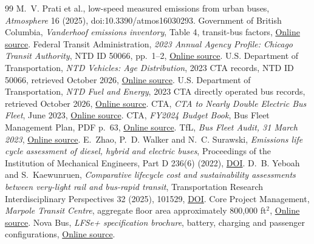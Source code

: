 \documentclass[12pt,letterpaper]{article}
\begin{document}
\begin{thebibliography}{99}
 M.~V. Prati et al., low-speed measured emissions from urban buses, \emph{Atmosphere} 16 (2025), doi:10.3390/atmos16030293.
 Government of British Columbia, \emph{Vanderhoof emissions inventory}, Table 4, transit-bus factors, \href{https://www2.gov.bc.ca/gov/content/environment/air-land-water/air/reports/emission-inventory-vanderhoof}{Online source}.
 Federal Transit Administration, \emph{2023 Annual Agency Profile: Chicago Transit Authority}, NTD ID 50066, pp.~1--2, \href{https://www.transit.dot.gov/sites/fta.dot.gov/files/transit_agency_profile_doc/2023/50066.pdf}{Online source}.
 U.S. Department of Transportation, \emph{NTD Vehicles: Age Distribution}, 2023 CTA records, NTD ID 50066, retrieved October 2026, \href{https://data.transportation.gov/d/6abt-uhgq}{Online source}.
 U.S. Department of Transportation, \emph{NTD Fuel and Energy}, 2023 CTA directly operated bus records, retrieved October 2026, \href{https://data.transportation.gov/d/8ehq-7his}{Online source}.
 CTA, \emph{CTA to Nearly Double Electric Bus Fleet}, June 2023, \href{https://www.transitchicago.com/cta-to-nearly-double-electric-bus-fleet/}{Online source}.
 CTA, \emph{FY2024 Budget Book}, Bus Fleet Management Plan, PDF p.~63, \href{https://www.transitchicago.com/assets/1/6/FY_2024_Budget_Book_\%28Web_Version\%29.pdf}{Online source}.
 TfL, \emph{Bus Fleet Audit, 31 March 2023}, \href{https://content.tfl.gov.uk/fleet-annual-audit-report-31-march-2023.pdf}{Online source}.
 E.~Zhao, P.~D. Walker and N.~C. Surawski, \emph{Emissions life cycle assessment of diesel, hybrid and electric buses}, Proceedings of the Institution of Mechanical Engineers, Part D 236(6) (2022), \href{https://doi.org/10.1177/09544070211034318}{DOI}.
 D.~B. Yeboah and S.~Kaewunruen, \emph{Comparative lifecycle cost and sustainability assessments between very-light rail and bus-rapid transit}, Transportation Research Interdisciplinary Perspectives 32 (2025), 101529, \href{https://doi.org/10.1016/j.trip.2025.101529}{DOI}.
 Core Project Management, \emph{Marpole Transit Centre}, aggregate floor area approximately 800,000 ft$^2$, \href{https://corepm.ca/projects/marpole-transit-centre/}{Online source}.
 Nova Bus, \emph{LFSe+ specification brochure}, battery, charging and passenger configurations, \href{https://us.novabus.com/wp-content/uploads/sites/2/2019/10/LFSe_brochure_march2021_EN.pdf}{Online source}.

\end{thebibliography}
\end{document}
